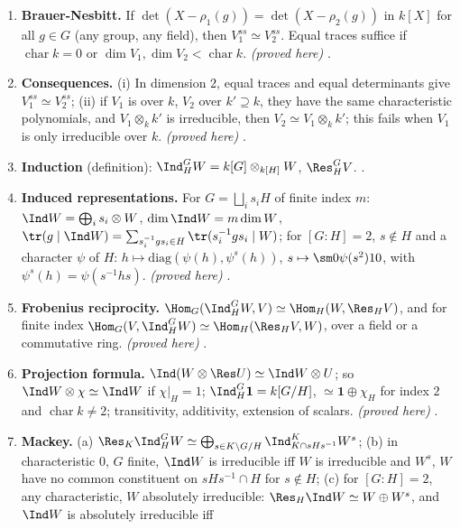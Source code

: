 \begin{enumerate}[label=\textbf{\thechapter.\arabic*}]
(a) the image of $k[G]\to\prod_i\End_k(S_i)$ is $\prod_i\End_{D_i}(S_i)$; (b) if $k=\bar k$, it is $\prod_i\End_k(S_i)$.
\emph{(proved here)} .
\item \textbf{Brauer-Nesbitt.} If $\det(X-\rho_1(g))=\det(X-\rho_2(g))$ in $k[X]$ for all $g\in G$ (any group, any field), then
$V_1^{ss}\simeq V_2^{ss}$. Equal traces suffice if $\operatorname{char}k=0$ or $\dim V_1,\dim V_2<\operatorname{char}k$. \emph{(proved here)}
.
\item \textbf{Consequences.} (i) In dimension $2$, equal traces and equal determinants give $V_1^{ss}\simeq V_2^{ss}$; (ii) if $V_1$ is over
$k$, $V_2$ over $k'\supseteq k$, they have the same characteristic polynomials, and $V_1\otimes_kk'$ is irreducible, then
$V_2\simeq V_1\otimes_kk'$; this fails when $V_1$ is only irreducible over $k$. \emph{(proved here)} .
\item \textbf{Induction} (definition): $\Ind_H^GW=k[G]\otimes_{k[H]}W$, $\Res_H^GV$. .
\item \textbf{Induced representations.} For $G=\bigsqcup_is_iH$ of finite index $m$: $\Ind W=\bigoplus_is_i\otimes W$, $\dim\Ind W=m\dim W$,
$\tr(g\mid\Ind W)=\sum_{s_i^{-1}gs_i\in H}\tr(s_i^{-1}gs_i\mid W)$; for $[G:H]=2$, $s\notin H$ and a character $\psi$ of $H$:
$h\mapsto\mathrm{diag}(\psi(h),\psi^s(h))$, $s\mapsto\sm0{\psi(s^2)}10$, with $\psi^s(h)=\psi(s^{-1}hs)$. \emph{(proved here)} .
\item \textbf{Frobenius reciprocity.} $\Hom_G(\Ind_H^GW,V)\simeq\Hom_H(W,\Res_HV)$, and for finite index $\Hom_G(V,\Ind_H^GW)\simeq\Hom_H(\Res_HV,W)$,
over a field or a commutative ring. \emph{(proved here)} .
\item \textbf{Projection formula.} $\Ind(W\otimes\Res U)\simeq\Ind W\otimes U$; so $\Ind W\otimes\chi\simeq\Ind W$ if $\chi|_H=1$; $\Ind_H^G\mathbf1=k[G/H]$,
$\simeq\mathbf1\oplus\chi_H$ for index $2$ and $\operatorname{char}k\ne2$; transitivity, additivity, extension of scalars. \emph{(proved here)}
.
\item \textbf{Mackey.} (a) $\Res_K\Ind_H^GW\simeq\bigoplus_{s\in K\backslash G/H}\Ind^K_{K\cap sHs^{-1}}W^s$; (b) in characteristic $0$, $G$ finite,
$\Ind W$ is irreducible iff $W$ is irreducible and $W^s$, $W$ have no common constituent on $sHs^{-1}\cap H$ for $s\notin H$; (c) for
$[G:H]=2$, any characteristic, $W$ absolutely irreducible: $\Res_H\Ind W\simeq W\oplus W^s$, and $\Ind W$ is absolutely irreducible iff

\end{enumerate}
